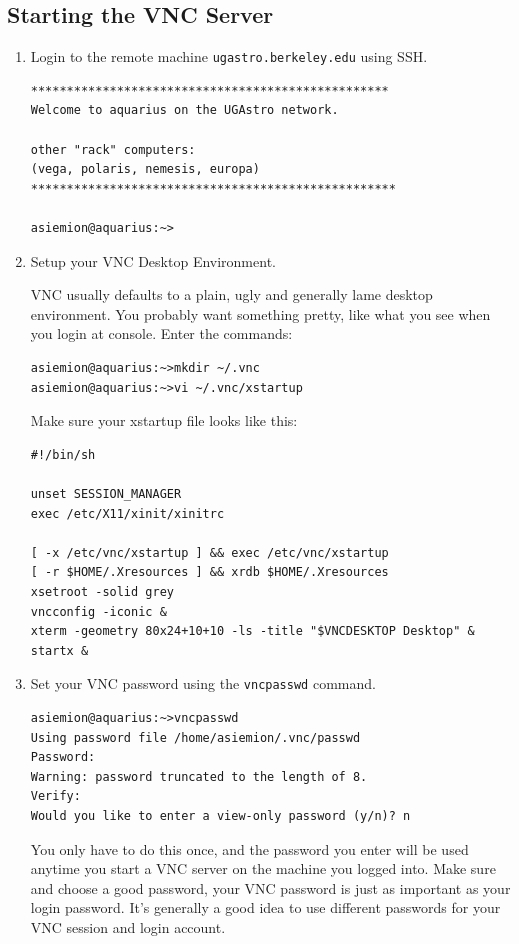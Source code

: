 \documentclass[11pt,preprint]{aastex}
\begin{document}
\subsection{Starting the VNC Server}
\begin{enumerate}

\item Login to the remote machine \verb$ugastro.berkeley.edu$ using SSH.\\
\begin{verbatim}
**************************************************
Welcome to aquarius on the UGAstro network.

other "rack" computers: 
(vega, polaris, nemesis, europa)
***************************************************

asiemion@aquarius:~>
\end{verbatim}

\item Setup your VNC Desktop Environment.

VNC usually defaults to a plain, ugly and generally lame desktop environment.  You probably want something pretty, like what you see when you login at console.
Enter the commands:
\begin{verbatim}
asiemion@aquarius:~>mkdir ~/.vnc
asiemion@aquarius:~>vi ~/.vnc/xstartup
\end{verbatim}
Make sure your xstartup file looks like this: 
\begin{verbatim}
#!/bin/sh

unset SESSION_MANAGER
exec /etc/X11/xinit/xinitrc

[ -x /etc/vnc/xstartup ] && exec /etc/vnc/xstartup
[ -r $HOME/.Xresources ] && xrdb $HOME/.Xresources
xsetroot -solid grey
vncconfig -iconic &
xterm -geometry 80x24+10+10 -ls -title "$VNCDESKTOP Desktop" &
startx &
\end{verbatim}

\item Set your VNC password using the \verb$vncpasswd$ command.
\begin{verbatim}
asiemion@aquarius:~>vncpasswd
Using password file /home/asiemion/.vnc/passwd
Password: 
Warning: password truncated to the length of 8.
Verify:   
Would you like to enter a view-only password (y/n)? n
\end{verbatim}

You only have to do this once, and the password you enter will be used anytime you start a VNC server on the machine you logged into.  Make sure and choose a good password, 
your VNC password is just as important as your login password.  It's generally a good idea to use different passwords for your VNC session and login account.


\end{enumerate}
\end{document}
